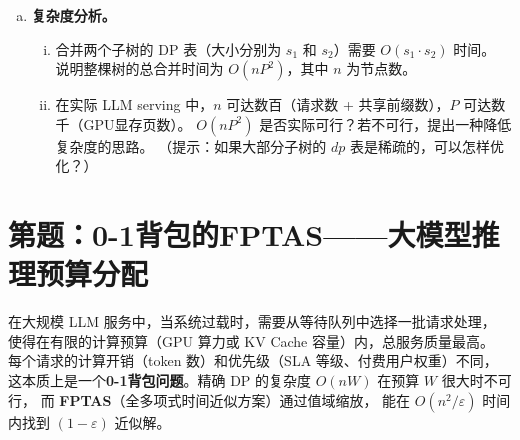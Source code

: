 \documentclass[12pt, a4paper]{ctexart}
\newcounter{problem}
\newcommand{\problem}[1]{%
    \stepcounter{problem}%
    \section*{第\chinese{problem}题：#1}%
}
\begin{document}
\begin{enumerate}[(a)]
\begin{center}
\begin{tikzpicture}
\end{tikzpicture}
\end{center}
 
    例如，服务请求 $R_1$ 需要分配路径 root $\to A \to R_1$ 共 $1 + 1 + 2 = 4$ 页；
    若同时服务 $R_1$ 和 $R_2$，共享 root 和 $A$ 的页，总共只需 $1 + 1 + 2 + 1 = 5$ 页。
 
    \begin{enumerate}[i.]
        \item 自底向上计算每个节点的 $dp[v][j]$ 表。
        先算叶节点 $R_1$--$R_5$，再合并算内部节点 $A$、$B$，最后算 root。
        \item 在预算 $P = 7$ 下，最优方案服务哪些请求？最大总收益是多少？
        \item 验证前缀共享带来的节省：
        若不共享前缀（每个请求独立分配从根到叶的全部页），
        服务同样的请求集合需要多少页？节省了多少？
    \end{enumerate}
 
    \item \textbf{复杂度分析。}
    \begin{enumerate}[i.]
        \item 合并两个子树的 DP 表（大小分别为 $s_1$ 和 $s_2$）需要 $O(s_1 \cdot s_2)$ 时间。
        说明整棵树的总合并时间为 $O(nP^2)$，其中 $n$ 为节点数。
        \item 在实际 LLM serving 中，$n$ 可达数百（请求数 + 共享前缀数），$P$ 可达数千（GPU显存页数）。
        $O(nP^2)$ 是否实际可行？若不可行，提出一种降低复杂度的思路。
        （提示：如果大部分子树的 $dp$ 表是稀疏的，可以怎样优化？）
    \end{enumerate}
\end{enumerate}
 


\problem{0-1背包的FPTAS——大模型推理预算分配}
 
\begin{mlcontext}
在大规模 LLM 服务中，当系统过载时，需要从等待队列中选择一批请求处理，
使得在有限的计算预算（GPU 算力或 KV Cache 容量）内，总服务质量最高。
每个请求的计算开销（token 数）和优先级（SLA 等级、付费用户权重）不同，
这本质上是一个\textbf{0-1背包问题}。精确 DP 的复杂度 $O(nW)$ 在预算 $W$ 很大时不可行，
而 \textbf{FPTAS}（全多项式时间近似方案）通过值域缩放，
能在 $O(n^2/\varepsilon)$ 时间内找到 $(1-\varepsilon)$ 近似解。
\end{mlcontext}
 
\end{document}
